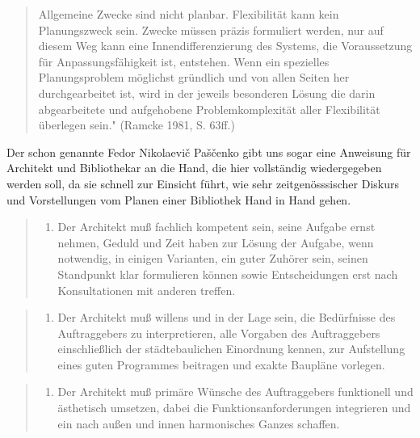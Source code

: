 \documentclass[a4paper,
fontsize=11pt,
oneside,
numbers=noperiodatend,
parskip=half-,
bibliography=totoc,
final
]{scrartcl}
\begin{document}
\begin{quote}
Allgemeine Zwecke sind nicht planbar. Flexibilität kann kein
Planungszweck sein. Zwecke müssen präzis formuliert werden, nur auf
diesem Weg kann eine Innendifferenzierung des Systems, die Voraussetzung
für Anpassungsfähigkeit ist, entstehen. Wenn ein spezielles
Planungsproblem möglichst gründlich und von allen Seiten her
durchgearbeitet ist, wird in der jeweils besonderen Lösung die darin
abgearbeitete und aufgehobene Problemkomplexität aller Flexibilität
überlegen sein." (Ramcke 1981, S. 63ff.)
\end{quote}

Der schon genannte Fedor Nikolaevič Paščenko gibt uns sogar eine
Anweisung für Architekt und Bibliothekar an die Hand, die hier
vollständig wiedergegeben werden soll, da sie schnell zur Einsicht
führt, wie sehr zeitgenösssischer Diskurs und Vorstellungen vom Planen
einer Bibliothek Hand in Hand gehen.

\begin{quote}
\begin{enumerate}
\def\labelenumi{\arabic{enumi}.}
\setcounter{enumi}{0}
\itemsep1pt\parskip0pt
\item
Der Architekt muß fachlich kompetent sein, seine Aufgabe ernst
nehmen, Geduld und Zeit haben zur Lösung der Aufgabe, wenn notwendig, in
einigen Varianten, ein guter Zuhörer sein, seinen Standpunkt klar
formulieren können sowie Entscheidungen erst nach Konsultationen mit
anderen treffen.
\end{enumerate}
\end{quote}

\begin{quote}
\begin{enumerate}
\def\labelenumi{\arabic{enumi}.}
\setcounter{enumi}{1}
\itemsep1pt\parskip0pt
\item
  Der Architekt muß willens und in der Lage sein, die Bedürfnisse des
  Auftraggebers zu interpretieren, alle Vorgaben des Auftraggebers
  einschließlich der städtebaulichen Einordnung kennen, zur Aufstellung
  eines guten Programmes beitragen und exakte Baupläne vorlegen.
\end{enumerate}
\end{quote}

\begin{quote}
\begin{enumerate}
\def\labelenumi{\arabic{enumi}.}
\setcounter{enumi}{2}
\itemsep1pt\parskip0pt
\item
  Der Architekt muß primäre Wünsche des Auftraggebers funktionell und
  ästhet\-isch umsetzen, dabei die Funktionsanforderungen integrieren und
  ein nach außen und innen harmonisches Ganzes schaffen.
\end{enumerate}
\end{quote}
\end{document}
